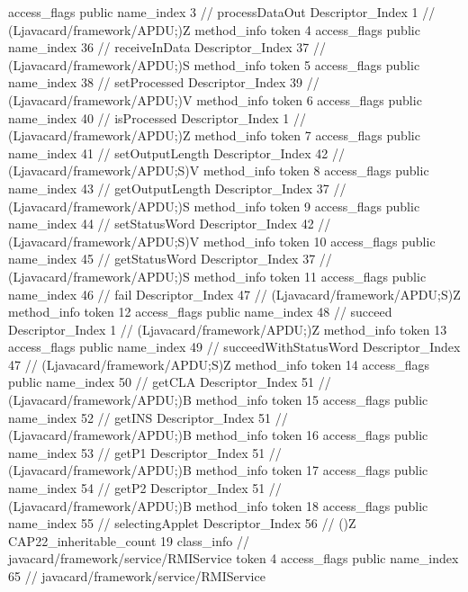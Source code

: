 {{{{{					access_flags	public
					name_index	3		// processDataOut
					Descriptor_Index	1		// (Ljavacard/framework/APDU;)Z
				}
				method_info {
					token	4
					access_flags	public
					name_index	36		// receiveInData
					Descriptor_Index	37		// (Ljavacard/framework/APDU;)S
				}
				method_info {
					token	5
					access_flags	public
					name_index	38		// setProcessed
					Descriptor_Index	39		// (Ljavacard/framework/APDU;)V
				}
				method_info {
					token	6
					access_flags	public
					name_index	40		// isProcessed
					Descriptor_Index	1		// (Ljavacard/framework/APDU;)Z
				}
				method_info {
					token	7
					access_flags	public
					name_index	41		// setOutputLength
					Descriptor_Index	42		// (Ljavacard/framework/APDU;S)V
				}
				method_info {
					token	8
					access_flags	public
					name_index	43		// getOutputLength
					Descriptor_Index	37		// (Ljavacard/framework/APDU;)S
				}
				method_info {
					token	9
					access_flags	public
					name_index	44		// setStatusWord
					Descriptor_Index	42		// (Ljavacard/framework/APDU;S)V
				}
				method_info {
					token	10
					access_flags	public
					name_index	45		// getStatusWord
					Descriptor_Index	37		// (Ljavacard/framework/APDU;)S
				}
				method_info {
					token	11
					access_flags	public
					name_index	46		// fail
					Descriptor_Index	47		// (Ljavacard/framework/APDU;S)Z
				}
				method_info {
					token	12
					access_flags	public
					name_index	48		// succeed
					Descriptor_Index	1		// (Ljavacard/framework/APDU;)Z
				}
				method_info {
					token	13
					access_flags	public
					name_index	49		// succeedWithStatusWord
					Descriptor_Index	47		// (Ljavacard/framework/APDU;S)Z
				}
				method_info {
					token	14
					access_flags	public
					name_index	50		// getCLA
					Descriptor_Index	51		// (Ljavacard/framework/APDU;)B
				}
				method_info {
					token	15
					access_flags	public
					name_index	52		// getINS
					Descriptor_Index	51		// (Ljavacard/framework/APDU;)B
				}
				method_info {
					token	16
					access_flags	public
					name_index	53		// getP1
					Descriptor_Index	51		// (Ljavacard/framework/APDU;)B
				}
				method_info {
					token	17
					access_flags	public
					name_index	54		// getP2
					Descriptor_Index	51		// (Ljavacard/framework/APDU;)B
				}
				method_info {
					token	18
					access_flags	public
					name_index	55		// selectingApplet
					Descriptor_Index	56		// ()Z
				}
			}
			CAP22_inheritable_count	19
		}
		class_info {		// javacard/framework/service/RMIService
			token	4
			access_flags	public
			name_index	65		// javacard/framework/service/RMIService
}}}
